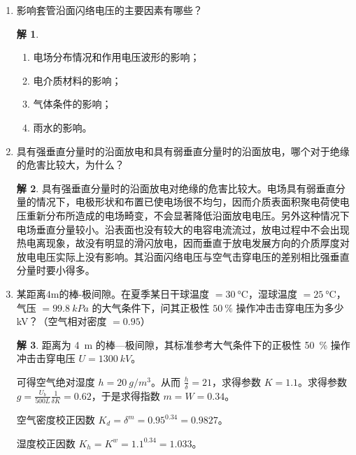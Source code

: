 \documentclass[zihao=-4,fontset = none]{ctexart}
\theoremstyle{definition}
\newtheorem*{solution}{解}
\begin{document}
\begin{enumerate}
  \item 影响套管沿面闪络电压的主要因素有哪些？
  \begin{solution}
    \begin{enumerate}
      \item 电场分布情况和作用电压波形的影响；
      \item 电介质材料的影响；
      \item 气体条件的影响；
      \item 雨水的影响。
    \end{enumerate}
  \end{solution}
  \item 具有强垂直分量时的沿面放电和具有弱垂直分量时的沿面放电，哪个对于绝缘的危害比较大，为什么？
  \begin{solution}
    具有强垂直分量时的沿面放电对绝缘的危害比较大。电场具有弱垂直分量的情况下，电极形状和布置已使电场很不均匀，因而介质表面积聚电荷使电压重新分布所造成的电场畸变，不会显著降低沿面放电电压。另外这种情况下电场垂直分量较小。沿表面也没有较大的电容电流流过，放电过程中不会出现热电离现象，故没有明显的滑闪放电，因而垂直于放电发展方向的介质厚度对放电电压实际上没有影响。其沿面闪络电压与空气击穿电压的差别相比强垂直分量时要小得多。
  \end{solution}
  \item 某距离4m的棒-极间隙。在夏季某日干球温度 $=\SI{30}{\degreeCelsius}$，湿球温度 $=\SI{25}{\degreeCelsius}$，气压 $=\SI{99.8}{kPa}$ 的大气条件下，问其正极性 $\SI{50}{\percent}$ 操作冲击击穿电压为多少 \si{kV}？（空气相对密度 $=0.95$）
  \begin{solution}
    距离为 \SI{4}{m} 的棒—极间隙，其标准参考大气条件下的正极性 \SI{50}{\percent} 操作冲击击穿电压 $U = \SI{1300}{kV}$。
    
    可得空气绝对湿度 $h=\SI{20}{g/m^3}$。从而 $\frac{h}{\delta} = 21$，求得参数 $K=1.1$。求得参数 $g = \frac{U_b}{500L} \frac{1}{\delta K} = 0.62$，于是求得指数 $m = W = 0.34$。
    
    空气密度校正因数 $K_d = \delta^m = 0.95^{0.34} = 0.9827$。
    
    湿度校正因数 $K_h = K^w = 1.1^{0.34} = 1.033$。
    

\end{solution}
\end{enumerate}
\end{document}
